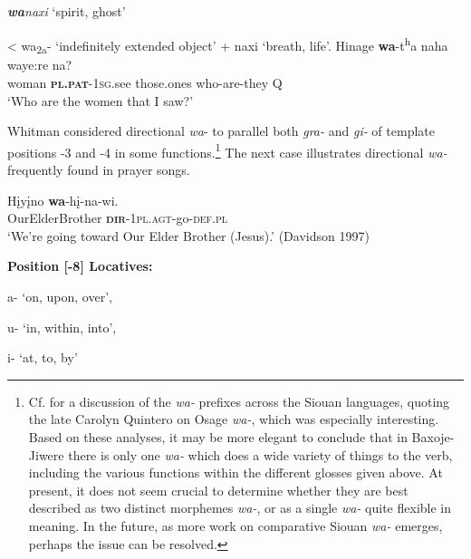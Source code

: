 \documentclass[output=paper]{LSP/langsci}
\begin{document}
\begin{exe}
\ex
\begin{xlist}
\ex \textit{\textbf{wa}naxi} `spirit, ghost' 

< wa\textsubscript{2a}- `indefinitely extended object' + naxi `breath, life'.                  	
\ex \gll Hinage   \textbf{wa}-t\textsuperscript{h}a  naha   waye:re  na?  \\           			
woman   \textbf{\textsc{pl.pat}}-\textsc{1sg.}see  those.ones who-are-they Q	\\
\trans `Who are the women that I saw?'
\end{xlist}
\end{exe}

Whitman considered directional \textit{wa}- to parallel both \textit{gra-} and \textit{gi-} of template positions -3 and -4 in some functions.\footnote{Cf. \citet{Boyle2009} for a discussion of the \textit{wa-} prefixes across the Siouan languages, quoting the late Carolyn Quintero on Osage \textit{wa-}, which was especially interesting. Based on these analyses, it may be more elegant to conclude that in Baxoje-Jiwere there is only one \textit{wa-} which does a wide variety of things to the verb, including the various functions within the different glosses given above. At present, it does not seem crucial to determine whether they are best described as two distinct morphemes \textit{wa-}, or as a single \textit{wa-} quite flexible in meaning. In the future, as more work on comparative Siouan \textit{wa-} emerges, perhaps the issue can be resolved.} The next case illustrates directional \textit{wa-} frequently found in prayer songs.	         		

\begin{exe}
\ex \gll H\k{i}y\k{i}no     \textbf{wa}-h\k{i}-na-wi. \\				      	        
OurElderBrother	  \textbf{\textsc{dir}}-1\textsc{pl.agt}-go-\textsc{def.pl} \\		           	  	        
\trans `We're going toward Our Elder Brother (Jesus).' (Davidson 1997)	
\end{exe}

\textbf{Position [-8] Locatives:}  	

\hspace{2em} a- `on, upon, over', 												

\hspace{2em} u- `in, within, into', 												

\hspace{2em} i- `at, to, by' \citep[241]{Whitman1947} 			
\end{document}
